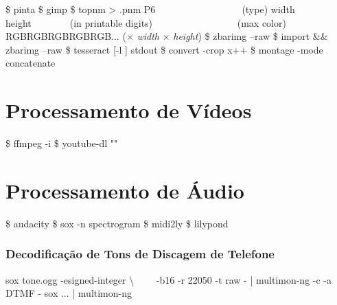 \documentclass{refcard}
\begin{document}
\begin{ldesc}
	   \$ pinta 
	 \$ gimp 
	    \$ topnm  > .pnm
	 P6~~~~~~~~~~~~~~~~~~\textnormal{(type)}\li
	                      width height~~~~~~~~\textnormal{(in printable digits)} ~~~~~~~~~~~~~~~~~\textnormal{(max color)} \li
					      RGBRGBRGBRGBRGB...  \textnormal{($\times$ \textit{width} $\times$ \textit{height})}
       \$ zbarimg --raw 
	 \$ import  \&\& zbarimg --raw 
	 \$ tesseract [-l ]  stdout
	\li[Crop]                 \$ convert -crop x++  
	       \$ montage -mode concatenate  
\end{ldesc}


\section{Processamento de Vídeos}

\begin{ldesc}
      \$ ffmpeg -i  
     \$ youtube-dl ""
\end{ldesc}


\section{Processamento de Áudio}

\begin{ldesc}
	   \$ audacity 
	\li[Espectrograma]                   \$ sox  -n spectrogram
	       \$ midi2ly 
	          \$ lilypond 
\end{ldesc}

\subsubsection{Decodificação de Tons de Discagem de Telefone}

\begin{ldesc}
	   sox tone.ogg -esigned-integer \textbackslash \li
	                   ~~~~-b16 -r 22050 -t raw - | \li
	                   multimon-ng -c -a DTMF -
	\li[Outros] sox ... | multimon-ng
\end{ldesc}
\end{document}
